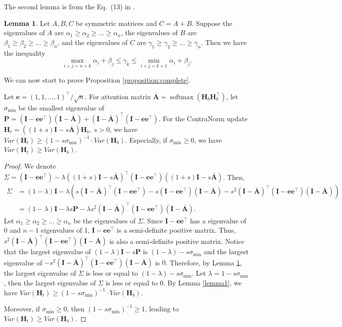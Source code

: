 \documentclass{article}
\def\ve{{\bm{e}}}
\def\mA{{\bm{A}}}
\def\mH{{\bm{H}}}
\def\mI{{\bm{I}}}
\def\mP{{\bm{P}}}
\theoremstyle{definition}
\newenvironment{manualproposition}[1]{\renewcommand\themanualtheoreminner{#1}\manualtheoreminner
}{\endmanualtheoreminner}
\newtheorem{lemma}{Lemma}[section]
\theoremstyle{remark}
\theoremstyle{theorem}
\begin{document}
The second lemma is from the Eq.~(13) in \cite{eigenvalue}.
\begin{lemma}
    Let $A,B,C$ be symmetric matrices and $C=A+B.$ Suppose the eigenvalues of $A$ are  $\alpha_1\geq\alpha_2\geq\dots\geq\alpha_n$, the eigenvalues of $B$ are  $\beta_1\geq\beta_2\geq\dots\geq\beta_n$, and the eigenvalues of $C$ are $\gamma_1\geq\gamma_2\geq\dots\geq\gamma_n$. Then we have the inequality
    \begin{equation}
        \max_{i+j=n+k}\alpha_i+\beta_j\leq\gamma_k\leq\min_{i+j=k+1}\alpha_i+\beta_j.
    \end{equation}\label{lemma2}
\end{lemma}
We can now start to prove Proposition \ref{proposition:complete}.
\begin{manualproposition}{1}
   Let $\ve=(1,1,\dots,1)^{\top}/\sqrt{n}$. For attention matrix $\bar{\mA}=\operatorname{softmax}(\mH_b\mH_b^{\top})$, let $\sigma_{\min}$ be the smallest eigenvalue of  $\mP=(\mI-\ve\ve^{\top})(\mI-\bar{\mA})+(\mI-\bar{\mA})^{\top}(\mI-\ve\ve^{\top})$. For the ContraNorm update $\mH_t=((1+s)\mI-s\bar{\mA})\mH_b,\ s>0$, we have $Var(\mH_t)\geq (1-s\sigma_{\min})^{-1}\cdot Var(\mH_b)$. Especially, if $\sigma_{\min}\geq0$, we have $Var(\mH_t)\geq Var(\mH_b)$.
\end{manualproposition}
\begin{proof}
    We denote $\Sigma=(\mI-\ve\ve^{\top})-\lambda((1+s)\mI-s\bar{\mA})^{\top}(\mI-\ve\ve^{\top})((1+s)\mI-s\bar{\mA})$. Then,
    \begin{equation}
    \begin{aligned}
        \Sigma&=(1-\lambda)\mI-\lambda(s(\mI-\bar{\mA})^{\top}(\mI-\ve\ve^{\top})-s(\mI-\ve\ve^{\top})(\mI-\bar{\mA})-s^2(\mI-\bar{\mA})^{\top}(\mI-\ve\ve^{\top})(\mI-\bar{\mA}))\\
        &=(1-\lambda)\mI-\lambda s\mP-\lambda s^2(\mI-\bar{\mA})^{\top}(\mI-\ve\ve^{\top})(\mI-\bar{\mA}).
    \end{aligned}
    \end{equation}
    Let $\alpha_1\geq\alpha_2\geq\dots\geq\alpha_n$ be the eigenvalues of $\Sigma$. Since $\mI-\ve\ve^{\top}$ has a eigenvalue of 0 and $n-1$ eigenvalues of 1, $\mI-\ve\ve^{\top}$ is a semi-definite positive matrix. Thus, $s^2(\mI-\bar{\mA})^{\top}(\mI-\ve\ve^{\top})(\mI-\bar{\mA})$ is also a semi-definite positive matrix. Notice that the largest eigenvalue of $(1-\lambda)\mI-s\mP$ is $(1-\lambda)-s\sigma_{\min}$ and the largest eigenvalue of $-s^2(\mI-\bar{\mA})^{\top}(\mI-\ve\ve^{\top})(\mI-\bar{\mA})$ is $0$. Therefore, by Lemma \ref{lemma2}, the largest eigenvalue of $\Sigma$ is less or equal to $(1-\lambda)-s\sigma_{\min}$. Let $\lambda=1-s\sigma_{\min}$, then the largest eigenvalue of $\Sigma$ is less or equal to $0$. By Lemma \ref{lemma1}, we have $Var(\mH_t)\geq (1-s\sigma_{\min})^{-1}\cdot Var(\mH_b)$.
    
    Moreover, if $\sigma_{\min}\geq 0$, then $(1-s\sigma_{\min})^{-1}\geq 1$, leading to $Var(\mH_t)\geq Var(\mH_b)$.
\end{proof}
\end{document}
